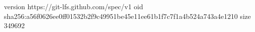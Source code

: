 version https://git-lfs.github.com/spec/v1
oid sha256:a56f0626ee0ff01532b2f9c49951be45e11ee61b1f7c7f1a4b524a743a4e1210
size 349692
